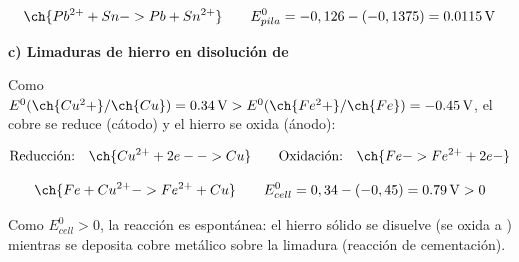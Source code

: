 \begin{exerciseEVAU}
\begin{solu}
        \begin{equation*}
            \ch{Pb^{2+} + Sn -> Pb + Sn^{2+}} \qquad E^0_{pila} = -0,126-(-0,1375) = \SI{0.0115}{\volt}
        \end{equation*}

        \textbf{c) Limaduras de hierro en disolución de }

        Como \(E^0(\ch{Cu^2+}/\ch{Cu}) = \SI{0.34}{\volt} > E^0(\ch{Fe^2+}/\ch{Fe}) = \SI{-0.45}{\volt}\), el cobre se reduce (cátodo) y el hierro se oxida (ánodo):

        \begin{equation*}
            \text{Reducción:} \quad \ch{Cu^{2+} + 2 e- -> Cu} \qquad \text{Oxidación:} \quad \ch{Fe -> Fe^{2+} + 2 e-}
        \end{equation*}

        \begin{equation*}
            \ch{Fe + Cu^{2+} -> Fe^{2+} + Cu} \qquad E^0_{cell} = 0,34-(-0,45) = \SI{0.79}{\volt} > 0
        \end{equation*}

        Como \(E^0_{cell} > 0\), la reacción es espontánea: el hierro sólido se disuelve (se oxida a ) mientras se deposita cobre metálico sobre la limadura (reacción de cementación).

    \end{solu}
\end{exerciseEVAU}

